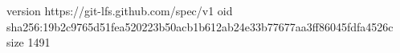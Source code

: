 version https://git-lfs.github.com/spec/v1
oid sha256:19b2c9765d51fea520223b50acb1b612ab24e33b77677aa3ff86045fdfa4526c
size 1491
